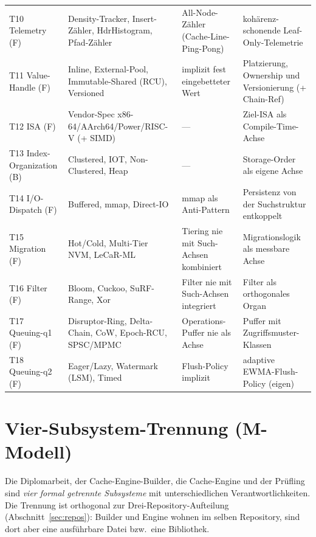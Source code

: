 {\begin{longtable}{@{}p{2.3cm}p{3.7cm}p{2.7cm}p{3.6cm}@{}}
T10 Telemetry (F) & Density-Tracker, Insert-Zähler, HdrHistogram, Pfad-Zähler & All-Node-Zähler (Cache-Line-Ping-Pong) & kohärenz-schonende Leaf-Only-Telemetrie \\
T11 Value-Handle (F) & Inline, External-Pool, Immutable-Shared (RCU), Versioned & implizit fest eingebetteter Wert & Platzierung, Ownership und Versionierung (+ Chain-Ref) \\
T12 ISA (F) & Vendor-Spec x86-64/AArch64/Power/RISC-V (+ SIMD) & --- & Ziel-ISA als Compile-Time-Achse \\
T13 Index-Organization (B) & Clustered, IOT, Non-Clustered, Heap & --- & Storage-Order als eigene Achse \\
T14 I/O-Dispatch (F) & Buffered, mmap, Direct-IO & mmap als Anti-Pattern & Persistenz von der Suchstruktur entkoppelt \\
T15 Migration (F) & Hot/Cold, Multi-Tier NVM, LeCaR-ML & Tiering nie mit Such-Achsen kombiniert & Migrationslogik als messbare Achse \\
T16 Filter (F) & Bloom, Cuckoo, SuRF-Range, Xor & Filter nie mit Such-Achsen integriert & Filter als orthogonales Organ \\
T17 Queuing-q1 (F) & Disruptor-Ring, Delta-Chain, CoW, Epoch-RCU, SPSC/MPMC & Operations-Puffer nie als Achse & Puffer mit Zugriffsmuster-Klassen \\
T18 Queuing-q2 (F) & Eager/Lazy, Watermark (LSM), Timed & Flush-Policy implizit & adaptive EWMA-Flush-Policy (eigen) \\
\end{longtable}
}

\section{Vier-Subsystem-Trennung (M-Modell)}\label{sec:m-model}

Die Diplomarbeit, der Cache-Engine-Builder, die Cache-Engine und der Prüfling sind
\emph{vier formal getrennte Subsysteme} mit unterschiedlichen Verantwortlichkeiten. Die Trennung ist
orthogonal zur Drei-Repository-Aufteilung (Abschnitt~\ref{sec:repos}): Builder und Engine wohnen im
selben Repository, sind dort aber eine ausführbare Datei bzw.\ eine Bibliothek.

